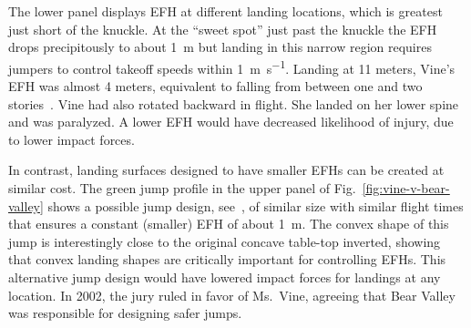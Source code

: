 \documentclass[smallextended]{svjour3}       %
\begin{document}
The lower panel displays EFH at different landing locations, which is greatest
just short of the knuckle.  At the ``sweet spot'' just past the knuckle the EFH
drops precipitously to  about 1~\si{\meter} but landing in this narrow region
requires jumpers to control takeoff speeds within 1~\si{\meter\per\second}.
Landing at 11 meters, Vine's EFH was almost 4 meters, equivalent to falling
from between one and two stories~\cite{Vish2005}. Vine had also rotated
backward in flight. She landed on her lower spine and was paralyzed. A lower
EFH would have decreased likelihood of injury, due to lower impact forces.

In contrast, landing surfaces designed to have smaller EFHs can be created at
similar cost. The green jump profile in the upper panel of
Fig.~\ref{fig:vine-v-bear-valley} shows a possible jump design,
see~\cite{Levy2015}, of similar size with similar flight times that ensures a
constant (smaller) EFH of about 1~\si{\meter}. The convex shape of this jump is
interestingly close to the original concave table-top  inverted, showing that
convex landing shapes are critically important for controlling EFHs. This
alternative jump design would have lowered impact forces for landings at any
location. In 2002, the jury ruled in favor of Ms.~Vine, agreeing that Bear
Valley was responsible for designing safer jumps.
\end{document}
